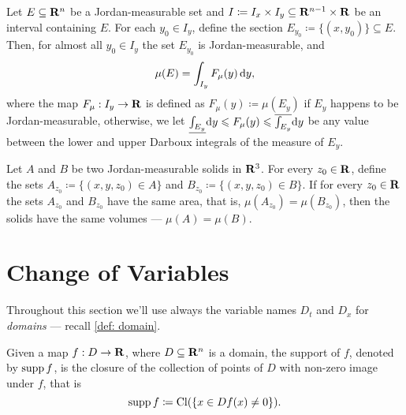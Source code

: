 \begin{corollary}
    \label{cor:slicing-measurable-sets-and-integrating}
    Let \(E \subseteq \mathbf{R}^n\) be a Jordan-measurable set and \(I \coloneq I_x \times
    I_y \subseteq \mathbf{R}^{n-1} \times \mathbf{R}\) be an interval containing \(E\). For each
    \(y_0 \in I_y\), define the section \(E_{y_0} \coloneq \{(x, y_{0})\} \subseteq
    E\). Then, for almost all \(y_0 \in I_y\) the set \(E_{y_0}\) is
    Jordan-measurable, and
    \[
        \mu(E) = \int_{I_y} F_{\mu}(y)\, \mathrm{d} y,
    \]
    where the map \(F_{\mu}: I_y \to \mathbf{R}\) is defined as \(F_{\mu}(y) \coloneq
    \mu(E_y)\) if \(E_y\) happens to be Jordan-measurable, otherwise, we let
    \(\underline{\int_{E_y}} \mathrm{d} y \leqslant F_{\mu}(y) \leqslant \overline{\int_{E_y}}
    \mathrm{d} y\) be any value between the lower and upper Darboux integrals of the
    measure of \(E_y\).
\end{corollary}

\begin{corollary}
    \label{cor:cavalieri-principle}
    Let \(A\) and \(B\) be two Jordan-measurable solids in \(\mathbf{R}^3\). For every \(z_0
    \in \mathbf{R}\), define the sets \(A_{z_0} \coloneq \{(x, y, z_{0}) \in A\}\) and
    \(B_{z_0} \coloneq \{(x, y, z_{0}) \in B\}\). If for every \(z_0 \in \mathbf{R}\) the
    sets \(A_{z_0}\) and \(B_{z_0}\) have the same area, that is, \(\mu(A_{z_0}) =
    \mu(B_{z_0})\), then the solids have the same volumes --- \(\mu(A) = \mu(B)\).
\end{corollary}

\section{Change of Variables}

\begin{remark}
    Throughout this section we'll use always the variable names \(D_t\) and \(D_x\)
    for \emph{domains} --- recall \cref{def: domain}.
\end{remark}

\begin{definition}
    \label{def:support-real-valued-map}
    Given a map \(f: D \to \mathbf{R}\), where \(D \subseteq \mathbf{R}^n\) is a domain, the support
    of \(f\), denoted by \(\operatorname{supp} f\), is the closure of the collection of points of
    \(D\) with non-zero image under \(f\), that is
    \[
        \operatorname{supp} f \coloneq \operatorname{Cl}(\{x \in D \relax f(x) \neq 0\}).
    \]
\end{definition}

